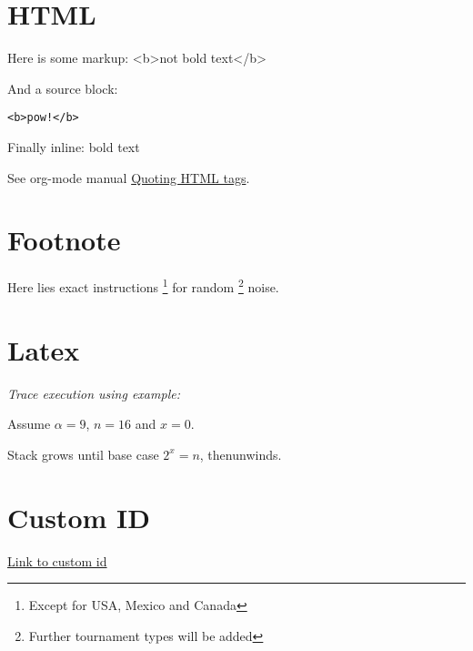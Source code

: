 \documentclass[UTF8,nofonts]{ctexart}
\begin{document}
\section{HTML}
\label{sec:orgheadline13}

Here is some markup: <b>not bold text</b>

And a source block:

\begin{verbatim}
<b>pow!</b>
\end{verbatim}

Finally inline: bold text

See org-mode manual \href{http://orgmode.org/manual/Quoting-HTML-tags.html#Quoting-HTML-tags}{Quoting HTML tags}.

\section{Footnote}
\label{sec:orgheadline14}

Here lies exact instructions \footnote{Except for USA, Mexico and Canada} for random \footnote{Further tournament types will be added} noise.

\section{Latex}
\label{sec:orgheadline15}

\emph{Trace execution using example:}

Assume \(\alpha=9\), \(n=16\) and \(x=0\).

Stack grows until base case \(2^{x}=n\), thenunwinds.

\section{Custom ID}
\label{sec:orgheadline16}

\hyperref[sec:orgheadline9]{Link to custom id}
\end{document}
